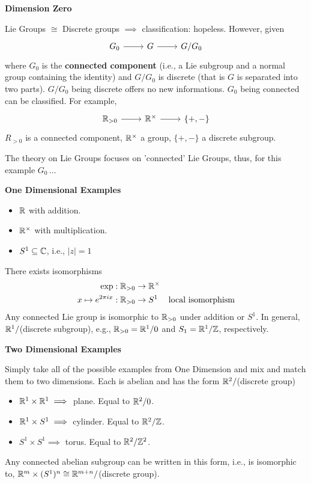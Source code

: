 \documentclass[12pt,a4paper]{report}
\begin{document}
\begin{description}
	\item \textbf{Dimension Zero}
	
	Lie Groups $\cong$ Discrete groups $\implies$ classification: hopeless.  However, given
\[
	\begin{tikzcd}[row sep=huge]
		G_0 \arrow[r] & G  \arrow[r] & G/G_0
	\end{tikzcd}
\]where $G_0$ is the \textbf{connected component} (i.e., a Lie subgroup and a normal group containing the identity) and $G/G_0$ is discrete (that is $G$ is separated into two parts).  $G/G_0$ being discrete offers no new informations.  $G_0$ being connected can be classified.  For example, \[
	\begin{tikzcd}[row sep=huge]
		\R_{> 0} \arrow[r] & \R^\times  \arrow[r] & \{+,-\}
	\end{tikzcd}
\]$R_{> 0}$ is a connected component, $\mathbb{R}^\times$ a group, $\{+,-\}$ a discrete subgroup.

The theory on Lie Groups focuses on 'connected' Lie Groups, thus, for this example $G_0\,\dots$ 


\item \textbf{One Dimensional Examples}

	\begin{itemize}
		\item $\mathbb{R}$ with addition.
		\item $\mathbb{R}^\times$ with multiplication.
		\item $S^1 \subseteq \mathbb{C}$, i.e., $|z|=1$
	\end{itemize}There exists isomorphisms
	\begin{align*}
		\operatorname{exp}:\mathbb{R}_{>0} &\to \mathbb{R}^\times\\
		x \mapsto e^{2\pi i x}:\mathbb{R}_{>0} &\to S^1 &\text{local isomorphism}
	\end{align*}Any connected Lie group is isomorphic to $\mathbb{R}_{> 0}$ under addition or $S^1$.  In general, $\mathbb{R}^1/$(discrete subgroup), e.g., $\mathbb{R}_{>0}=\mathbb{R}^1/0$ and $S_1=\mathbb{R}^1/\mathbb{Z}$, respectively.
	
	\item \textbf{Two Dimensional Examples}
	
	Simply take all of the possible examples from One Dimension and mix and match them to two dimensions.   	Each is abelian and has the form $\mathbb{R}^2/$(discrete group)
	\begin{itemize}
		\item $\mathbb{R}^1 \times \mathbb{R}^1 \implies $ plane.  Equal to $\mathbb{R}^2/0$.
		\item $\mathbb{R}^1 \times S^1 \implies $ cylinder.  Equal to $\mathbb{R}^2/\mathbb{Z}$.
		\item $S^1 \times S^1 \implies $ torus.  Equal to $\mathbb{R}^2/\mathbb{Z}^2$.
 	\end{itemize}Any connected abelian subgroup can be written in this form, i.e.,  is isomorphic to, $\mathbb{R}^m\times (S^1)^n \cong \mathbb{R}^{m+n}/$(discrete group).
 

\end{description}
\end{document}
